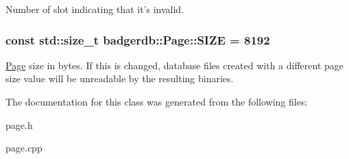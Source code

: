 Number of slot indicating that it's invalid. \hypertarget{classbadgerdb_1_1Page_ae92d52803502854f97309bae2c14ea55}{
\subsubsection[{S\-I\-Z\-E}]{\setlength{\rightskip}{0pt plus 5cm}const std\-::size\-\_\-t badgerdb\-::\-Page\-::\-S\-I\-Z\-E = 8192\hspace{0.3cm}{\ttfamily [static]}}}\label{classbadgerdb_1_1Page_ae92d52803502854f97309bae2c14ea55}
\hyperlink{classbadgerdb_1_1Page}{Page} size in bytes. If this is changed, database files created with a different page size value will be unreadable by the resulting binaries. 

The documentation for this class was generated from the following files\-:\begin{DoxyCompactItemize}
\item 
page.\-h\item 
page.\-cpp\end{DoxyCompactItemize}
